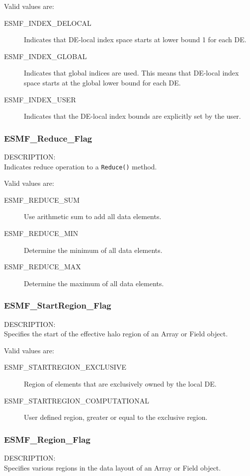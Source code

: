 Valid values are:
\begin{description}
\item [ESMF\_INDEX\_DELOCAL]
      Indicates that DE-local index space starts at lower bound 1 for each DE.
\item [ESMF\_INDEX\_GLOBAL]
      Indicates that global indices are used. This means that DE-local index
      space starts at the global lower bound for each DE.
\item [ESMF\_INDEX\_USER]
      Indicates that the DE-local index bounds are explicitly set by the user.
      
\end{description}

\subsubsection{ESMF\_Reduce\_Flag}
\label{opt:reduceflag}
{\sf DESCRIPTION:\\}
Indicates reduce operation to a {\tt Reduce()} method.

Valid values are:
\begin{description}
   \item [ESMF\_REDUCE\_SUM]
         Use arithmetic sum to add all data elements.
   \item [ESMF\_REDUCE\_MIN]
         Determine the minimum of all data elements.
   \item [ESMF\_REDUCE\_MAX]
         Determine the maximum of all data elements.
\end{description}

\subsubsection{ESMF\_StartRegion\_Flag}
\label{opt:startregion}
{\sf DESCRIPTION:\\}
Specifies the start of the effective halo region of an Array or Field object.

Valid values are:
\begin{description}
\item [ESMF\_STARTREGION\_EXCLUSIVE]
      Region of elements that are exclusively owned by the local DE.
\item [ESMF\_STARTREGION\_COMPUTATIONAL]
      User defined region, greater or equal to the exclusive region.
\end{description}

\subsubsection{ESMF\_Region\_Flag}
\label{opt:zeroregion}
{\sf DESCRIPTION:\\}
Specifies various regions in the data layout of an Array or Field object.

